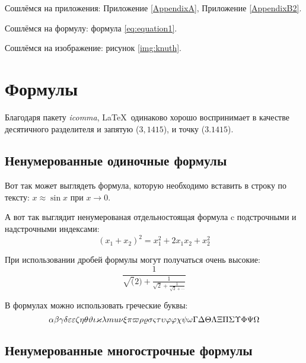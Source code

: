 


Сошлёмся на приложения: Приложение \ref{AppendixA}, Приложение \ref{AppendixB2}.

Сошлёмся на формулу: формула \eqref{eq:equation1}.

Сошлёмся на изображение: рисунок \ref{img:knuth}.


\section{Формулы} \label{sect1_3}

Благодаря пакету \textit{icomma}, \LaTeX~одинаково хорошо воспринимает в качестве десятичного разделителя и запятую ($3,1415$), и точку ($3.1415$).

\subsection{Ненумерованные одиночные формулы} \label{subsect1_3_1}

Вот так может выглядеть формула, которую необходимо вставить в строку по тексту: $x \approx \sin x$ при $x \to 0$.

А вот так выглядит ненумерованая отдельностоящая формула c подстрочными и надстрочными индексами:
\[
(x_1+x_2)^2 = x_1^2 + 2 x_1 x_2 + x_2^2
\]

При использовании дробей формулы могут получаться очень высокие:
\[
  \frac{1}{\sqrt(2)+
  \displaystyle\frac{1}{\sqrt{2}+
  \displaystyle\frac{1}{\sqrt{2}+\cdots}}}
\]

В формулах можно использовать греческие буквы:
\[
\alpha\beta\gamma\delta\epsilon\varepsilon\zeta\eta\theta\vartheta\iota\kappa\lambda\\mu\nu\xi\pi\varpi\rho\varrho\sigma\varsigma\tau\upsilon\phi\varphi\chi\psi\omega\Gamma\Delta\Theta\Lambda\Xi\Pi\Sigma\Upsilon\Phi\Psi\Omega
\]


\subsection{Ненумерованные многострочные формулы} \label{subsect1_3_2}

